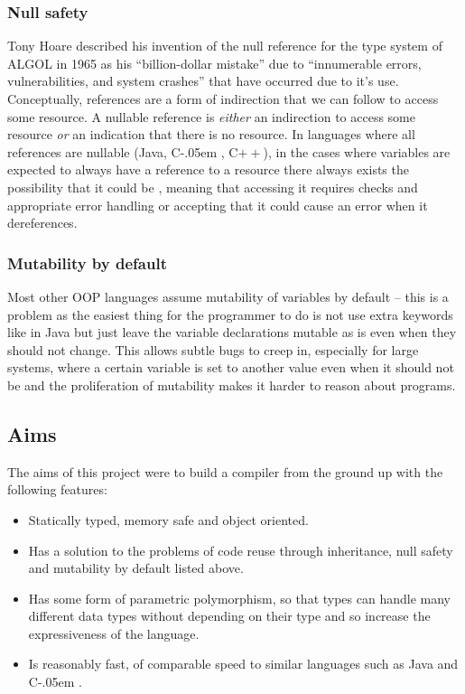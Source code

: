 \documentclass{article}
\newcommand{\bt}{\ensuremath{^{\backprime}}}
\newcommand{\sharponend}[1]{{\settoheight{\dimen0}{#1}#1\kern-.05em \resizebox{!}{\dimen0}{\raisebox{\depth}{\fontseries{b}\selectfont\#}}}}
\newcommand{\csharp}{\sharponend{C}\xspace}
\newcommand*{\cpp}{C\ensuremath{++}\xspace}
\newcommand{\code}[1]{\texttt{\StrSubstitute{#1}{`}{\bt}}}
\newcommand{\bcode}[1]{\code{#1}}
\begin{document}
\subsubsection{Null safety}
Tony Hoare described his invention of the null reference for the type system of ALGOL in 1965 as his ``billion-dollar mistake'' due to ``innumerable errors, vulnerabilities, and system crashes'' that have occurred due to it's use\cite{HOARE:2009}. Conceptually, references are a form of indirection that we can follow to access some resource. A nullable reference is \textit{either} an indirection to access some resource \textit{or} an indication that there is no resource. In languages where all references are nullable (Java, \csharp, \cpp), in the cases where variables are expected to always have a reference to a resource there always exists the possibility that it could be \bcode{null}, meaning that accessing it requires \bcode{null} checks and appropriate error handling or accepting that it could cause an error when it dereferences.

\subsubsection{Mutability by default}
Most other OOP languages assume mutability of variables by default -- this is a problem as the easiest thing for the programmer to do is not use extra keywords like \bcode{final} in Java but just leave the variable declarations mutable as is even when they should not change. This allows subtle bugs to creep in, especially for large systems, where a certain variable is set to another value even when it should not be and the proliferation of mutability makes it harder to reason about programs.

\subsection{Aims}
The aims of this project were to build a compiler from the ground up with the following features:
\begin{itemize}
	\item{Statically typed, memory safe and object oriented.}
	\item{Has a solution to the problems of code reuse through inheritance, null safety and mutability by default listed above.}
	\item{Has some form of parametric polymorphism, so that types can handle many different data types without depending on their type and so increase the expressiveness of the language.}
	\item{Is reasonably fast, of comparable speed to similar languages such as Java and \csharp.}
\end{itemize}
\end{document}
